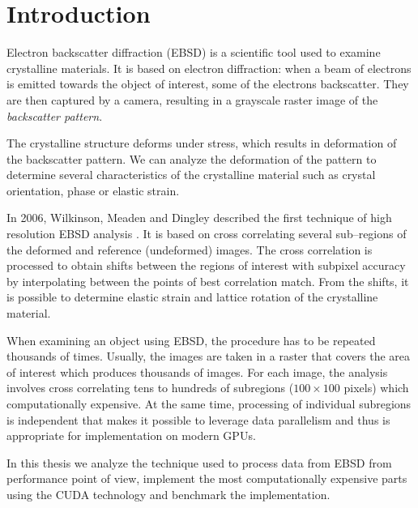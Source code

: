 \chapter*{Introduction}
Electron backscatter diffraction (EBSD) is a scientific tool used to examine crystalline materials. It is based on electron diffraction: when a beam of electrons is emitted towards the object of interest, some of the electrons backscatter. They are then captured by a camera, resulting in a grayscale raster image of the \emph{backscatter pattern}.

The crystalline structure deforms under stress, which results in deformation of the backscatter pattern. We can analyze the deformation of the pattern to determine several characteristics of the crystalline material such as crystal orientation, phase or elastic strain.

In 2006, Wilkinson, Meaden and Dingley described the first technique of high resolution EBSD analysis \cite{wilkinson2006high}. It is based on cross correlating several sub--regions of the deformed and reference (undeformed) images. The cross correlation is processed to obtain shifts between the regions of interest with subpixel accuracy by interpolating between the points of best correlation match. From the shifts, it is possible to determine elastic strain and lattice rotation of the crystalline material.

When examining an object using EBSD, the procedure has to be repeated thousands of times. Usually, the images are taken in a raster that covers the area of interest which produces thousands of images. For each image, the analysis involves cross correlating tens to hundreds of subregions ($100\times100$ pixels) which computationally expensive. At the same time, processing of individual subregions is independent that makes it possible to leverage data parallelism and thus is appropriate for implementation on modern GPUs.

In this thesis we analyze the technique used to process data from EBSD from performance point of view, implement the most computationally expensive parts using the CUDA technology and benchmark the implementation. 
